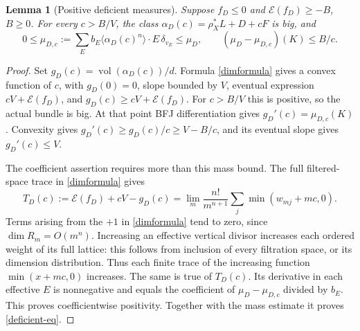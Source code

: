 \documentclass[10pt]{article}
\newtheorem{lemma}[theorem]{Lemma}
\newcommand{\vol}{\operatorname{vol}}
\begin{document}
\begin{lemma}[Positive deficient measures]\label{deficient}
Suppose $f_D\leq0$ and $\mathscr E(f_D)\geq-B$, $B\geq0$.
For every $c>B/V$, the class $\alpha_D(c)=\rho_X^*L+D+cF$ is big, and
\begin{equation}\label{deficient-eq}
 0\leq\mu_{D,c}:=\sum_Eb_E\langle\alpha_D(c)^n\rangle\cdot E\,\delta_{v_E}
 \leq\mu_D,\qquad (\mu_D-\mu_{D,c})(K)\leq B/c.
\end{equation}
\end{lemma}
\begin{proof}
Set $g_D(c)=\vol(\alpha_D(c))/d$. Formula \eqref{dimformula} gives
a convex function of $c$, with $g_D(0)=0$, slope bounded by $V$,
eventual expression $cV+\mathscr E(f_D)$, and
$g_D(c)\geq cV+\mathscr E(f_D)$. For $c>B/V$ this is positive,
so the actual bundle is big. At that point BFJ differentiation gives
$g_D'(c)=\mu_{D,c}(K)$. Convexity gives
$g_D'(c)\geq g_D(c)/c\geq V-B/c$, and its eventual slope gives
$g_D'(c)\leq V$.

The coefficient assertion requires more than this mass bound. The full
filtered-space trace in \eqref{dimformula} gives
\[
 T_D(c):=\mathscr E(f_D)+cV-g_D(c)
       =\lim_m\frac{n!}{m^{n+1}}\sum_j\min(w_{mj}+mc,0).
\]
Terms arising from the $+1$ in \eqref{dimformula} tend to zero, since
$\dim R_m=O(m^n)$. Increasing an effective vertical divisor increases
each ordered weight of its full lattice: this follows from inclusion
of every filtration space, or its dimension distribution. Thus each
finite trace of the increasing function $\min(x+mc,0)$ increases.
The same is true of $T_D(c)$. Its derivative in each effective $E$
is nonnegative and equals the coefficient of $\mu_D-\mu_{D,c}$
divided by $b_E$. This proves coefficientwise positivity.
Together with the mass estimate it proves \eqref{deficient-eq}.
\end{proof}
\end{document}
